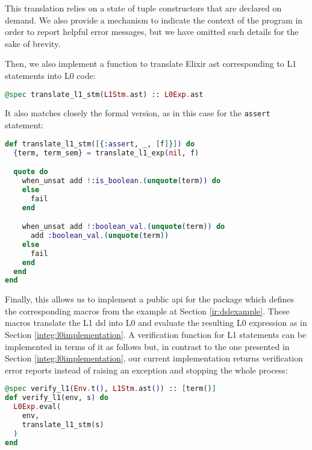 This translation relies on a state of tuple constructors that are declared on 
demand. We also provide a mechanism to indicate the context of the program in
order to report helpful error messages, but we have omitted such details for the
sake of brevity. 

Then, we also implement a function to translate Elixir \gls{ast} corresponding
to L1 statements into L0 code:

\begin{lstlisting}[language=elixir,numbers=none,frame=none]
@spec translate_l1_stm(L1Stm.ast) :: L0Exp.ast
\end{lstlisting}

It also matches closely the formal version, as in this case for the 
\verb|assert| statement:

\begin{lstlisting}[language=elixir,numbers=none,frame=none]
def translate_l1_stm([{:assert, _, [f]}]) do
  {term, term_sem} = translate_l1_exp(nil, f)

  quote do
    when_unsat add !:is_boolean.(unquote(term)) do
    else
      fail
    end

    when_unsat add !:boolean_val.(unquote(term)) do
      add :boolean_val.(unquote(term))
    else
      fail
    end
  end
end
\end{lstlisting}

Finally, this allows us to implement a public \gls{api} for the package which
defines the corresponding macros from the example at Section
\ref{ir:dslexample}. These macros translate the L1 \gls{dsl} into L0 and
evaluate the resulting L0 expression as in Section \ref{integ:l0implementation}.
A verification function for L1 statements can be implemented in terms of it as
follows but, in contrast to the one presented in Section
\ref{integ:l0implementation}, our current implementation returns verification
error reports instead of raising an exception and stopping the whole process:

\begin{lstlisting}[language=elixir,numbers=none,frame=none]
@spec verify_l1(Env.t(), L1Stm.ast()) :: [term()]
def verify_l1(env, s) do
  L0Exp.eval(
    env,
    translate_l1_stm(s)
  )
end
\end{lstlisting}
